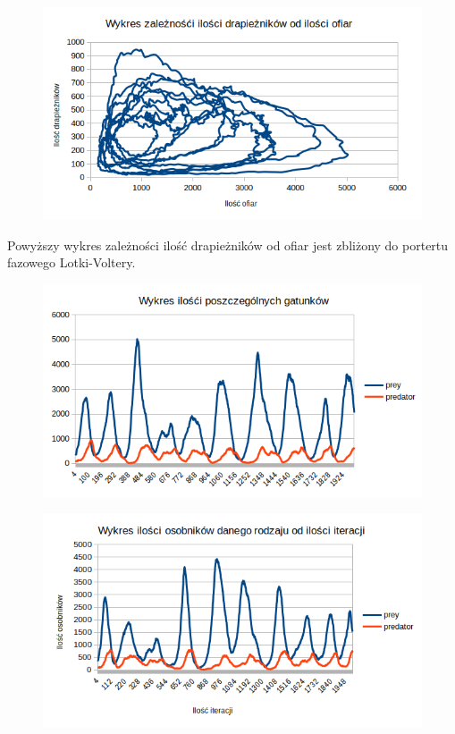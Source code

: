 \begin{figure}[H]
	\centering
	\includegraphics[width=1.1\linewidth]{img/ok11}
	\caption{\label{fig:screen} }
\end{figure}
Powyższy wykres zależności ilość drapieżników od ofiar jest zbliżony do portertu fazowego Lotki-Voltery.
\begin{figure}[H]
	\centering
	\includegraphics[width=1.1\linewidth]{img/ok1}
	\caption{\label{fig:screen} }
\end{figure}

\begin{figure}[H]
	\centering
	\includegraphics[width=1.1\linewidth]{img/ok2}
	\caption{\label{fig:screen} }
\end{figure}



